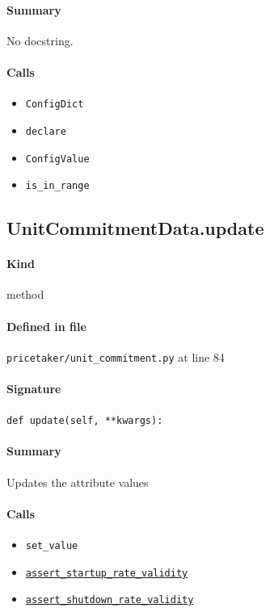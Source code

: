 \documentclass[11pt]{report}
\begin{document}
\paragraph{Summary} No docstring.
\paragraph{Calls}
\begin{itemize}[leftmargin=*]
  \item \texttt{ConfigDict}
  \item \texttt{declare}
  \item \texttt{ConfigValue}
  \item \texttt{is\_in\_range}
\end{itemize}
\subsection{UnitCommitmentData.update}
\label{def:pricetaker-unit_commitment.py:UnitCommitmentData.update:L84}
\paragraph{Kind} method
\paragraph{Defined in file} \texttt{pricetaker/unit\_commitment.py} at line 84
\paragraph{Signature} \texttt{def update(self, **kwargs):}
\paragraph{Summary} Updates the attribute values
\paragraph{Calls}
\begin{itemize}[leftmargin=*]
  \item \texttt{set\_value}
  \item \hyperref[def:pricetaker-unit_commitment.py:UnitCommitmentData.assert_startup_rate_validity:L90]{\texttt{assert\_startup\_rate\_validity}}
  \item \hyperref[def:pricetaker-unit_commitment.py:UnitCommitmentData.assert_shutdown_rate_validity:L103]{\texttt{assert\_shutdown\_rate\_validity}}
\end{itemize}
\end{document}
